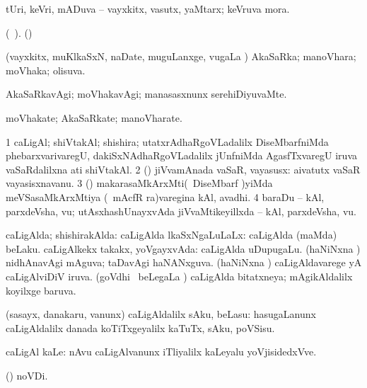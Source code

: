 {{{{{{\bentry
{}
  \gl{\nA}\bmng
tUri, keVri, mADuva -- vayxkitx, vasutx, yaMtarx; keVruva mora. 
\emng
\eentry

\bentry
{}
  \gl{\nA} (\bava\ ). \bmng
(\ashi)  
\emng
\eentry

\bentry
{}
  \gl{\gu}\bmng
(vayxkitx, muKlkaSxN, naDate, muguLanxge, \mo vugaLa \vi) AkaSaRka; manoVhara; moVhaka; olisuva. 
\emng
\eentry

\bentry
{}
  \gl{\kirxvi}\bmng
AkaSaRkavAgi; moVhakavAgi; manasasxnunx serehiDiyuvaMte. 
\emng
\eentry

\bentry
{}
  \gl{\nA}\bmng
moVhakate; AkaSaRkate; manoVharate. 
\emng
\eentry

\bentry
{} 
\gl{\nA}
\expl{}
\bmng
\bnum
\num{1} caLigAl; shiVtakAl; shishira; utatxrAdhaRgoVLadalilx DiseMbarfniMda phebarxvarivaregU, dakiSxNAdhaRgoVLadalilx jUnfniMda AgasfTxvaregU iruva vaSaRdalilxna ati shiVtakAl. 
\num{2} (\kAparx) jiVvamAnada vaSaR, vayasusx:  aivatutx vaSaR vayasisxnavanu. 
\num{3} (\Kavi) makarasaMkArxMti(\su\ DiseMbarf )yiMda meVSasaMkArxMtiya (\su\ mAcfR ra)varegina kAl, avadhi. 
\num{4} baraDu -- kAl, parxdeVsha, \mo vu; utAsxhashUnayxvAda jiVvaMtikeyillxda -- kAl, parxdeVsha, \mo vu. 
\enum
\emng
\eentry

\bentry
{} 
\gl{\gu}
\bmng
caLigAlda; shishirakAlda: 
\banum
{} caLigAlda lkaSxNgaLuLaLx:  caLigAlda (maMda) beLaku. 
 caLigAlkekx takakx, yoVgayxvAda:  caLigAlda uDupugaLu. 
 (haNiNxna \vi) nidhAnavAgi mAguva; taDavAgi haNANxguva. 
 (haNiNxna \vi) caLigAldavarege yA caLigAlviDiV iruva. 
 (goVdhi \mo\ beLegaLa \vi) caLigAlda bitatxneya; mAgikAldalilx koyilxge baruva. 
\eanum
\emng
\eentry

\bentry
{} 
\gl{\sakirx}
\bmng
(sasayx, danakaru, \mo vanunx) caLigAldalilx sAku, beLasu:  hasugaLanunx caLigAldalilx danada koTiTxgeyalilx kaTuTx, sAku, poVSisu. 
\emng

\noindent
\gl{\akirx}
\bmng
caLigAl kaLe:  nAvu caLigAlvanunx iTliyalilx kaLeyalu yoVjisidedxVve. 
\emng
\eentry

\bentry
{}
 \gl{\nA}\bmng
{} (\pagu) noVDi. 
\emng
\eentry

}}}}}}
